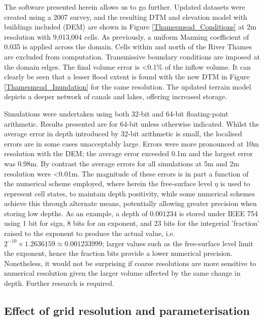 The software presented herein allows us to go further. Updated datasets were created using a 2007 survey, and the resulting DTM and elevation model with buildings included (DEM) are shown in Figure \ref{Thamesmead_Conditions} at 2m resolution with 9,013,004 cells. As previously, a uniform Manning coefficient of 0.035 is applied across the domain. Cells within and north of the River Thames are excluded from computation. Transmissive boundary conditions are imposed at the domain edges. The final volume error is \textless0.1\% of the inflow volume. It can clearly be seen that a lesser flood extent is found with the new DTM in Figure \ref{Thamesmead_Inundation} for the same resolution. The updated terrain model depicts a deeper network of canals and lakes, offering increased storage.

Simulations were undertaken using both 32-bit and 64-bit floating-point arithmetic. Results presented are for 64-bit unless otherwise indicated. Whilst the average error in depth introduced by 32-bit arithmetic is small, the localised errors are in some cases unacceptably large. Errors were more pronounced at 10m resolution with the DEM; the average error exceeded 0.1m and the largest error was 0.98m. By contrast the average errors for all simulations at 5m and 2m resolution were \textless 0.01m. The magnitude of these errors is in part a function of the numerical scheme employed, where herein the free-surface level $\eta$ is used to represent cell states, to maintain depth positivity, while some numerical schemes achieve this through alternate means, potentially allowing greater precision when storing low depths. As an example, a depth of $0.001234$ is stored under IEEE 754 using 1 bit for sign, 8 bits for an exponent, and 23 bits for the integerial 'fraction' raised to the exponent to produce the actual value, i.e. $2^{-10} \times 1.2636159 \approx 0.001233999$; larger values such as the free-surface level limit the exponent, hence the fraction bits provide a lower numerical precision. Nonetheless, it would not be surprising if coarse resolutions are more sensitive to numerical resolution given the larger volume affected by the same change in depth. Further research is required.

\subsection{Effect of grid resolution and parameterisation}


